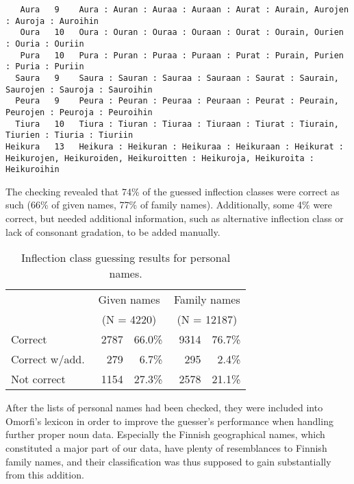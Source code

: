 \documentclass{llncs}
\begin{document}
\small
\begin{verbatim}
   Aura   9    Aura : Auran : Auraa : Auraan : Aurat : Aurain, Aurojen : Auroja : Auroihin
   Oura   10   Oura : Ouran : Ouraa : Ouraan : Ourat : Ourain, Ourien : Ouria : Ouriin
   Pura   10   Pura : Puran : Puraa : Puraan : Purat : Purain, Purien : Puria : Puriin
  Saura   9    Saura : Sauran : Sauraa : Sauraan : Saurat : Saurain, Saurojen : Sauroja : Sauroihin
  Peura   9    Peura : Peuran : Peuraa : Peuraan : Peurat : Peurain, Peurojen : Peuroja : Peuroihin
  Tiura   10   Tiura : Tiuran : Tiuraa : Tiuraan : Tiurat : Tiurain, Tiurien : Tiuria : Tiuriin
Heikura   13   Heikura : Heikuran : Heikuraa : Heikuraan : Heikurat : Heikurojen, Heikuroiden, Heikuroitten : Heikuroja, Heikuroita : Heikuroihin
\end{verbatim}
\normalsize

The checking revealed that 74\% of the guessed inflection classes were
correct as such (66\% of given names, 77\% of family
names). Additionally, some 4\% were correct, but needed additional
information, such as alternative inflection class or lack of consonant
gradation, to be added manually.

\begin{table}
\begin{center}
\begin{tabular}{l|rr|rr}
               & \multicolumn{2}{c|}{Given names}  & \multicolumn{2}{c}{Family names}\\
               & \multicolumn{2}{c|}{(N = 4220)}   & \multicolumn{2}{c}{(N = 12187)}\\
\hline
Correct        & ~2787  &  66.0\%  &    ~9314  &  76.7\%\\
Correct w/add. & ~~279  &   6.7\%  &    ~~295  &   2.4\%\\
Not correct    & ~1154  &  27.3\%  &    ~2578  &  21.1\%\\
\end{tabular}
\caption{Inflection class guessing results for personal names.}\label{tab:lang-id-acc}
\end{center}
\end{table}

After the lists of personal names had been checked, they were included
into Omorfi's lexicon in order to improve the guesser's performance
when handling further proper noun data. Especially the Finnish
geographical names, which constituted a major part of our data, have
plenty of resemblances to Finnish family names, and their classification 
was thus supposed to gain substantially from this addition.
\end{document}
